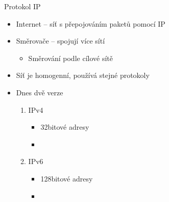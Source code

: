 \begin{frame}{Protokol IP}

  \begin{itemize}
    \item Internet -- síť s přepojováním paketů pomocí IP

    \pause

    \item Směrovače -- spojují více sítí
    \begin{itemize}
      \item Směrování podle cílové sítě
    \end{itemize}

    \pause

    \item Síť je homogenní, používá stejné protokoly

    \pause

    \item Dnes dvě verze
    \begin{enumerate}
      \item IPv4
      \begin{itemize}
	\item 32bitové adresy
	\item {}
      \end{itemize}

      \item IPv6
      \begin{itemize}
	\item 128bitové adresy
	\item {}
      \end{itemize}
    \end{enumerate}
  \end{itemize}

\end{frame}

